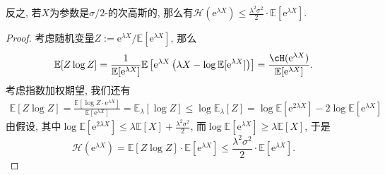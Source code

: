 \begin{remark}
	反之, 若$X$为参数是$\sigma/2$-的次高斯的, 那么有$\mathcal{H}(\mathrm{e}^{\lambda X}) \leq \frac{\lambda^2 \sigma^2}{2} \cdot \mathbb{E}[\mathrm{e}^{\lambda X}]$. 
	\begin{proof}
		考虑随机变量$Z := \mathrm{e}^{\lambda X} / \mathbb{E}[\mathrm{e}^{\lambda X}]$, 那么
		\begin{equation*}
			\mathbb{E}[Z \log Z] 
			= \frac{1}{\mathbb{E}[\mathrm{e}^{\lambda X}]} \mathbb{E} \left[ \mathrm{e}^{\lambda X} \left(\lambda X - \log \mathbb{E}[\mathrm{e}^{\lambda X}] \right) \right]
			= \frac{\cH(\mathrm{e}^{\lambda X})}{\mathbb{E}[\mathrm{e}^{\lambda X}]}. 
		\end{equation*}
		考虑指数加权期望, 我们还有
		\begin{align*}
			\mathbb{E}[Z \log Z]
			= \frac{\mathbb{E}[\log Z \cdot \mathrm{e}^{\lambda X}]}{\mathbb{E}[\mathrm{e}^{\lambda X}]}
			= \mathbb{E}_{\lambda}[\log Z]
			\leq \log \mathbb{E}_{\lambda} [Z]
			= \log \mathbb{E}[\mathrm{e}^{2\lambda X}] - 2 \log \mathbb{E}[\mathrm{e}^{\lambda X}]
		\end{align*}
		由假设, 其中$\log \mathbb{E}[\mathrm{e}^{2\lambda X}] \leq \lambda \mathbb{E}[X] + \frac{\lambda^2 \sigma^2}{2}$, 而$\log \mathbb{E}[\mathrm{e}^{\lambda X}] \geq \lambda \mathbb{E}[X]$, 于是
		\begin{equation*}
			\mathcal{H}(\mathrm{e}^{\lambda X})
			= \mathbb{E}[Z \log Z] \cdot \mathbb{E}[\mathrm{e}^{\lambda X}]
			\leq \frac{\lambda^2 \sigma^2}{2} \cdot \mathbb{E}[\mathrm{e}^{\lambda X}]. 
		\end{equation*}
	\end{proof}
\end{remark}

